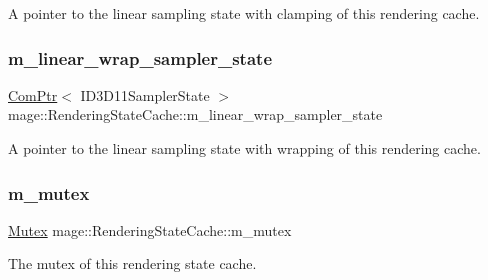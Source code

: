 A pointer to the linear sampling state with clamping of this rendering cache. \hypertarget{structmage_1_1_rendering_state_cache_a7f7289f3759840045dbe3dd2785199a8}{}\label{structmage_1_1_rendering_state_cache_a7f7289f3759840045dbe3dd2785199a8} 
\subsubsection{\texorpdfstring{m\+\_\+linear\+\_\+wrap\+\_\+sampler\+\_\+state}{m\_linear\_wrap\_sampler\_state}}
{\footnotesize\ttfamily \hyperlink{namespacemage_ae74f374780900893caa5555d1031fd79}{Com\+Ptr}$<$ I\+D3\+D11\+Sampler\+State $>$ mage\+::\+Rendering\+State\+Cache\+::m\+\_\+linear\+\_\+wrap\+\_\+sampler\+\_\+state\hspace{0.3cm}{\ttfamily [private]}}

A pointer to the linear sampling state with wrapping of this rendering cache. \hypertarget{structmage_1_1_rendering_state_cache_a97aad58b39eedbeeb27ed47c87ded52a}{}\label{structmage_1_1_rendering_state_cache_a97aad58b39eedbeeb27ed47c87ded52a} 
\subsubsection{\texorpdfstring{m\+\_\+mutex}{m\_mutex}}
{\footnotesize\ttfamily \hyperlink{structmage_1_1_mutex}{Mutex} mage\+::\+Rendering\+State\+Cache\+::m\+\_\+mutex\hspace{0.3cm}{\ttfamily [private]}}

The mutex of this rendering state cache. \hypertarget{structmage_1_1_rendering_state_cache_adaf1dd35ebb8e0ad9f2135ad0efee67a}{}\label{structmage_1_1_rendering_state_cache_adaf1dd35ebb8e0ad9f2135ad0efee67a} 
